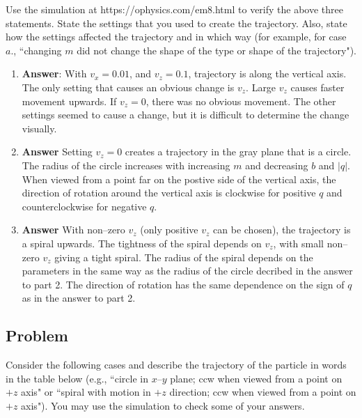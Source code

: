 \documentclass{article}
\begin{document}
Use the simulation at https://ophysics.com/em8.html to verify the above three statements. State the settings that you used to create the trajectory. Also, state how the settings affected the trajectory and in which way (for example, for case $a.$, ``changing $m$ did not change the shape of the type or shape of the trajectory").

\begin{enumerate}

  \item \ifsolutions
        \textbf{Answer}: With $v_x=0.01$, and $v_z=0.1$, trajectory is along the vertical axis. The only setting that causes an obvious change is $v_z$. Large $v_z$ causes faster movement upwards. If $v_z=0$, there was no obvious movement. The other settings seemed to cause a change, but it is difficult to determine the change visually.
        \else
        \vskip 120pt
        \fi
        \ifsolutions\else
        \vskip 120pt
        \fi

  \item \ifsolutions
        \textbf{Answer} Setting $v_z=0$ creates a trajectory in the gray plane that is a circle. The radius of the circle increases with increasing $m$ and decreasing $b$ and $|q|$. When viewed from a point far on the postive side of the vertical axis, the direction of rotation around the vertical axis is clockwise for positive $q$ and counterclockwise for negative $q$.
        \else
        \vskip 120pt
        \fi
        \ifsolutions\else
        \vskip 120pt
        \fi

  \item \ifsolutions
        \textbf{Answer} With non--zero $v_z$ (only positive $v_z$ can be chosen), the trajectory is a spiral upwards. The tightness of the spiral depends on $v_z$, with small non--zero $v_z$ giving a tight spiral. The radius of the spiral depends on the parameters in the same way as the radius of the circle decribed in the answer to part 2. The direction of rotation has the same dependence on the sign of $q$ as in the answer to part 2.
        \else
        \vskip 120pt
        \fi
        \ifsolutions\else
        \vskip 120pt
        \fi

\end{enumerate}

\subsection{Problem}

Consider the following cases and describe the trajectory of the particle in words in the table below (e.g., ``circle in $x$--$y$ plane; ccw when viewed from a point on $+z$ axis" or ``spiral with motion in $+z$ direction; ccw when viewed from a point on $+z$ axis"). You may use the simulation to check some of your answers. 
\end{document}
